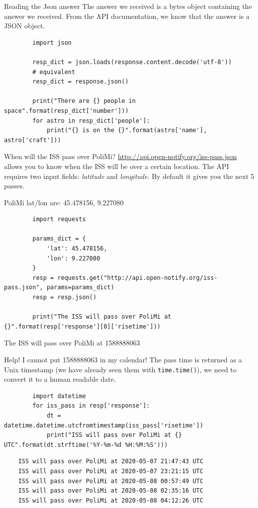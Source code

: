\documentclass[aspectratio=169,handout]{beamer}
\begin{document}
\begin{frame}[fragile]{Reading the Json answer}
    The answer we received is a bytes object containing the answer we received.
    From the API documentation, we know that the answer is a JSON object.
    \begin{verbatim}
        import json

        resp_dict = json.loads(response.content.decode('utf-8'))
        # equivalent
        resp_dict = response.json()

        print("There are {} people in space".format(resp_dict['number']))
        for astro in resp_dict['people']:
            print("{} is on the {}".format(astro['name'], astro['craft']))
    \end{verbatim}
\end{frame}

\begin{frame}[fragile]{When will the ISS pass over PoliMi?}
    \url{http://api.open-notify.org/iss-pass.json} allows you to know when the ISS will be over a certain location.
    The API requires two input fields: \emph{latitude} and \emph{longitude}. By default it gives you the next 5 passes.

    PoliMi lat/lon are: 45.478156, 9.227080

    \begin{verbatim}
        import requests

        params_dict = {
            'lat': 45.478156,
            'lon': 9.227080
        }
        resp = requests.get("http://api.open-notify.org/iss-pass.json", params=params_dict)
        resp = resp.json()

        print("The ISS will pass over PoliMi at {}".format(resp['response'][0]['risetime']))
    \end{verbatim}

The ISS will pass over PoliMi at 1588888063
\end{frame}

\begin{frame}[fragile]{Help! I cannot put 1588888063 in my calendar!}
    The pass time is returned as a Unix timestamp (we have already seen them with \texttt{time.time()}), we need to
    convert it to a human readable date.

    \begin{verbatim}
        import datetime
        for iss_pass in resp['response']:
            dt = datetime.datetime.utcfromtimestamp(iss_pass['risetime'])
            print("ISS will pass over PoliMi at {} UTC".format(dt.strftime('%Y-%m-%d %H:%M:%S')))
    \end{verbatim}

    \begin{verbatim}
    ISS will pass over PoliMi at 2020-05-07 21:47:43 UTC
    ISS will pass over PoliMi at 2020-05-07 23:21:15 UTC
    ISS will pass over PoliMi at 2020-05-08 00:57:49 UTC
    ISS will pass over PoliMi at 2020-05-08 02:35:16 UTC
    ISS will pass over PoliMi at 2020-05-08 04:12:26 UTC
    \end{verbatim}
\end{frame}
\end{document}
